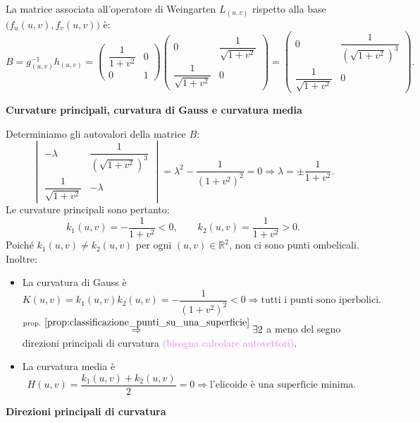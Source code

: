 \begin{esempio}[Elicoide]
        La matrice associata all'operatore di Weingarten $L_{(u,v)}$ rispetto alla base $\bigl(f_u(u,v), f_v(u,v)\bigr)$ è:
        \[
        B = g_{(u,v)}^{-1} h_{(u,v)} = 
        \begin{pmatrix}
        \dfrac{1}{1+v^2} & 0 \\[1em]
        0 & 1
        \end{pmatrix}
        \begin{pmatrix}
        0 & \dfrac{1}{\sqrt{1+v^2}} \\[1em]
        \dfrac{1}{\sqrt{1+v^2}} & 0
        \end{pmatrix}
        =
        \begin{pmatrix}
        0 & \dfrac{1}{(\sqrt{1+v^2})^3} \\[1em]
        \dfrac{1}{\sqrt{1+v^2}} & 0
        \end{pmatrix}.
        \]

        \noindent\textbf{Curvature principali, curvatura di Gauss e curvatura media}

        Determiniamo gli autovalori della matrice $B$:
        \[
        \begin{vmatrix}
        -\lambda & \dfrac{1}{(\sqrt{1+v^2})^3} \\[1em]
        \dfrac{1}{\sqrt{1+v^2}} & -\lambda
        \end{vmatrix}
        = \lambda^2 - \frac{1}{(1+v^2)^2} = 0 \Rightarrow \lambda = \pm \frac{1}{1+v^2}.
        \]
        Le curvature principali sono pertanto:
        \[
        k_1(u,v) = -\frac{1}{1+v^2} < 0, \qquad k_2(u,v) = \frac{1}{1+v^2} > 0.
        \]
        Poiché $k_1(u,v) \neq k_2(u,v)$ per ogni $(u,v) \in \mathbb{R}^2$, non ci sono punti ombelicali.
        Inoltre:
        \begin{itemize}
            \item La curvatura di Gauss è
            \[
            K(u,v) = k_1(u,v) k_2(u,v) = -\frac{1}{(1+v^2)^2} < 0 \Rightarrow \text{tutti i punti sono iperbolici.} 
            \]
            $\overset{\text{prop. } \ref{prop:classificazione_punti_su_una_superficie}}{\Rightarrow} \exists 2$ a meno del segno direzioni principali di curvatura 
            \textcolor{violet}{(bisogna calcolare autovettori)}.
            \item La curvatura media è
            \[
            H(u,v) = \frac{k_1(u,v) + k_2(u,v)}{2} = 0 \Rightarrow \text{l'elicoide è una superficie minima.}
            \]
        \end{itemize}
        \newpage
        \noindent\textbf{Direzioni principali di curvatura}


\end{esempio}
